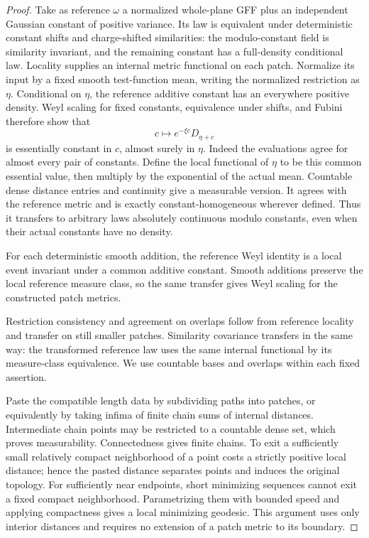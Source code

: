 \begin{proof}
Take as reference $\omega$ a normalized whole-plane GFF plus an independent
Gaussian constant of positive variance.  Its law is equivalent under
deterministic constant shifts and charge-shifted similarities: the
modulo-constant field is similarity invariant, and the remaining constant
has a full-density conditional law.  Locality supplies an internal metric
functional on each patch.  Normalize its input by a fixed smooth
test-function mean, writing the normalized restriction as $\eta$.
Conditional on $\eta$, the reference additive constant has an everywhere
positive density.  Weyl scaling for fixed constants, equivalence under
shifts, and Fubini therefore show that
\[
 c\longmapsto e^{-\xi c}D_{\eta+c}
\]
is essentially constant in $c$, almost surely in $\eta$.  Indeed the
evaluations agree for almost every pair of constants.  Define the local
functional of $\eta$ to be this common essential value, then multiply by
the exponential of the actual mean.  Countable dense distance entries and
continuity give a measurable version.  It agrees with the reference metric
and is exactly constant-homogeneous wherever defined.  Thus it transfers
to arbitrary laws absolutely continuous modulo constants, even when their
actual constants have no density.

For each deterministic smooth addition, the reference Weyl identity is a
local event invariant under a common additive constant.  Smooth additions
preserve the local reference measure class, so the same transfer gives
Weyl scaling for the constructed patch metrics.

Restriction consistency and agreement on overlaps follow from reference
locality and transfer on still smaller patches.  Similarity covariance
transfers in the same way: the transformed reference law uses the same
internal functional by its measure-class equivalence.  We use countable
bases and overlaps within each fixed assertion.

Paste the compatible length data by subdividing paths into patches, or
equivalently by taking infima of finite chain sums of internal distances.
Intermediate chain points may be restricted to a countable dense set,
which proves measurability.  Connectedness gives finite chains.  To exit
a sufficiently small relatively compact neighborhood of a point costs a
strictly positive local distance; hence the pasted distance separates
points and induces the original topology.  For sufficiently near
endpoints, short minimizing sequences cannot exit a fixed compact
neighborhood.  Parametrizing them with bounded speed and applying compactness
gives a local minimizing geodesic.  This argument uses only interior
distances and requires no extension of a patch metric to its boundary.
\end{proof}


